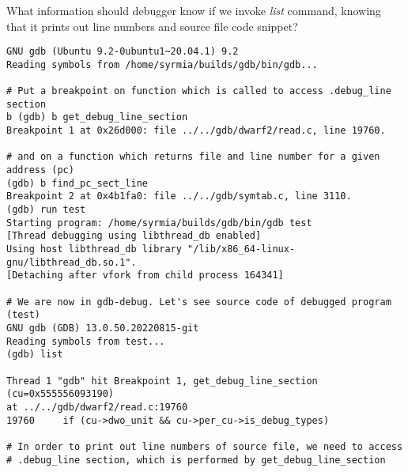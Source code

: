\documentclass{report}
\begin{document}
What information should debugger know if we invoke \textit{list} command, knowing that it prints out line numbers and source file code snippet?
\begin{verbatim}
GNU gdb (Ubuntu 9.2-0ubuntu1~20.04.1) 9.2
Reading symbols from /home/syrmia/builds/gdb/bin/gdb...

# Put a breakpoint on function which is called to access .debug_line section
b (gdb) b get_debug_line_section
Breakpoint 1 at 0x26d000: file ../../gdb/dwarf2/read.c, line 19760.

# and on a function which returns file and line number for a given address (pc)
(gdb) b find_pc_sect_line
Breakpoint 2 at 0x4b1fa0: file ../../gdb/symtab.c, line 3110.
(gdb) run test
Starting program: /home/syrmia/builds/gdb/bin/gdb test
[Thread debugging using libthread_db enabled]
Using host libthread_db library "/lib/x86_64-linux-gnu/libthread_db.so.1".
[Detaching after vfork from child process 164341]

# We are now in gdb-debug. Let's see source code of debugged program (test)
GNU gdb (GDB) 13.0.50.20220815-git
Reading symbols from test...
(gdb) list

Thread 1 "gdb" hit Breakpoint 1, get_debug_line_section (cu=0x555556093190)
at ../../gdb/dwarf2/read.c:19760
19760	  if (cu->dwo_unit && cu->per_cu->is_debug_types)

# In order to print out line numbers of source file, we need to access 
# .debug_line section, which is performed by get_debug_line_section


\end{verbatim}
\end{document}
